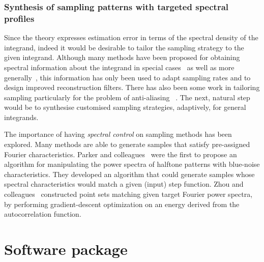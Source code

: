 \documentclass[11pt,fleqn]{book} %
\begin{document}
\subsection{Synthesis of sampling patterns with targeted spectral profiles}
Since the theory expresses estimation error in terms of the spectral density of the integrand, indeed it would be desirable to tailor the sampling strategy to the given integrand. Although many methods have been proposed for obtaining spectral information about the integrand in special cases~\cite{Egan:2009,Soler:2009,Ramamoorthi:2012,bagher:2013} as well as more generally~\cite{Durand:2005,Cov5D}, this information has only been used to adapt sampling rates and to design improved reconstruction filters. There has also been some work in tailoring sampling particularly for the problem of anti-aliasing ~\cite{Ahmed:2015:APP,Heck:2013:BNS}. The next, natural step would be to synthesise customised sampling strategies, adaptively, for general integrands. 

The importance of having \emph{spectral control} on sampling methods has been explored.  Many methods are  able to generate samples that satisfy pre-assigned Fourier characteristics. Parker and colleagues~\cite{parker1991new} were the first to propose an algorithm for manipulating the power spectra of halftone patterns with blue-noise characteristics. They developed an algorithm that could generate samples whose spectral characteristics would match a given (input) step function. Zhou and colleagues~\cite{Zhou:2012} constructed point sets matching given target Fourier power spectra, by performing  gradient-descent optimization on an energy derived from the autocorrelation function. 



 \chapter{Software package}
 
\end{document}
